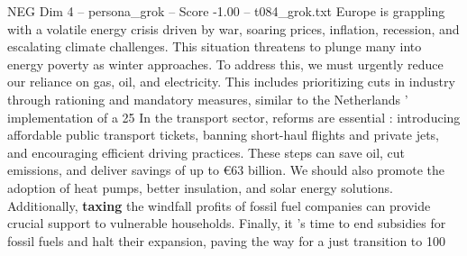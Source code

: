 \begin{textsample}{NEG Dim 4 – persona\_grok – Score -1.00 – t084\_grok.txt}  \label{ex:f4_neg_024}
Europe is grappling with a volatile energy crisis driven by war, soaring prices, inflation, recession, and escalating climate challenges.
This situation threatens to plunge many into energy poverty as winter approaches.
To address this, we must urgently reduce our reliance on gas, oil, and electricity.
This includes prioritizing cuts in industry through rationing and mandatory measures, similar to the Netherlands ' implementation of a 25 %
In the transport sector, reforms are essential : introducing affordable public transport tickets, banning short-haul flights and private jets, and encouraging efficient driving practices.
These steps can save oil, cut emissions, and deliver savings of up to €63 billion.
We should also promote the adoption of heat pumps, better insulation, and solar energy solutions.
Additionally, \textbf{taxing} the windfall profits of fossil fuel companies can provide crucial support to vulnerable households.
Finally, it 's time to end subsidies for fossil fuels and halt their expansion, paving the way for a just transition to 100 %

\end{textsample}
